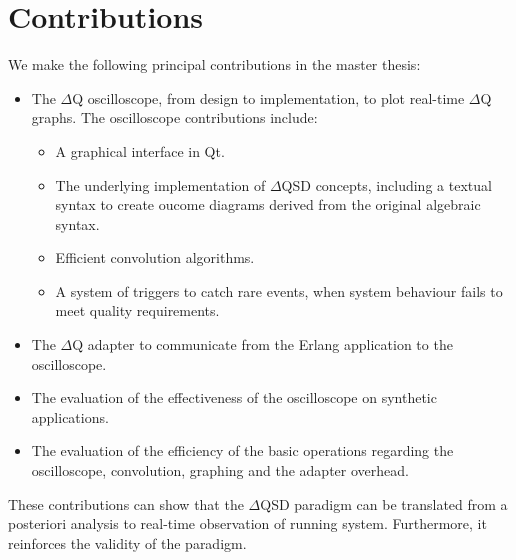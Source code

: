 \section{Contributions}
    We make the following principal contributions in the master thesis:
    \begin{itemize}
        \item The $\Delta$Q oscilloscope, from design to implementation, to plot real-time $\Delta$Q graphs. The oscilloscope contributions include:
        \begin{itemize}
            \item A graphical interface in Qt.
            \item The underlying implementation of $\Delta$QSD concepts, including a textual syntax to create oucome diagrams derived from the original algebraic syntax.
            \item Efficient convolution algorithms.
            \item A system of triggers to catch rare events, when system behaviour fails to meet quality requirements.
        \end{itemize}
        \item The $\Delta$Q adapter to communicate from the Erlang application to the oscilloscope.
        \item The evaluation of the effectiveness of the oscilloscope on synthetic applications.
        \item The evaluation of the efficiency of the basic operations regarding the oscilloscope, convolution, graphing and the adapter overhead.
    \end{itemize}

    These contributions can show that the $\Delta$QSD paradigm can be translated from a posteriori analysis to real-time observation of running system. Furthermore, it reinforces the validity of the paradigm.

